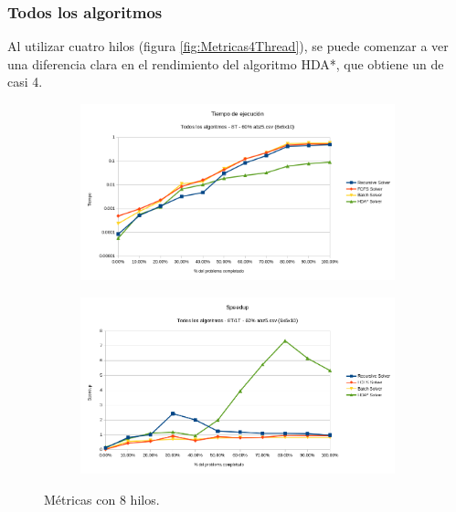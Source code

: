 \subsubsection{Todos los algoritmos}

Al utilizar cuatro hilos (figura \ref{fig:Metricas4Thread}), se puede comenzar a ver una diferencia clara
en el rendimiento del algoritmo HDA*, que obtiene un 
de casi 4.

\begin{figure}[h]
    \begin{subfigure}{.5\textwidth}
        \begin{center}
            \includegraphics[width=\textwidth]{Media/Ch2/Runtime_All_Algorithms_8.png}
        \end{center}
    \end{subfigure}
    \begin{subfigure}{.5\textwidth}
        \begin{center}
            \includegraphics[width=\textwidth]{Media/Ch2/Speedup_All_Algorithms_8.png}
        \end{center}
    \end{subfigure}
    \caption{Métricas con 8 hilos.}
    \label{fig:Metricas8Thread}
\end{figure}

